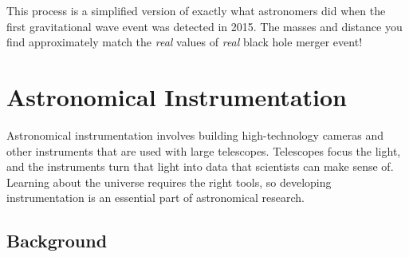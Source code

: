 \documentclass[14pt]{article}
\begin{document}
\noindent This process is a simplified version of exactly what astronomers did when the first gravitational wave event was detected in 2015. The masses and distance you find approximately match the \textit{real} values of \textit{real} black hole merger event!

\clearpage

\section{Astronomical Instrumentation}

Astronomical instrumentation involves building high-technology cameras and other instruments that are used with large telescopes. Telescopes focus the light, and the instruments turn that light into data that scientists can make sense of. Learning about the universe requires the right tools, so developing instrumentation is an essential part of astronomical research.

\subsection{Background}
\end{document}
